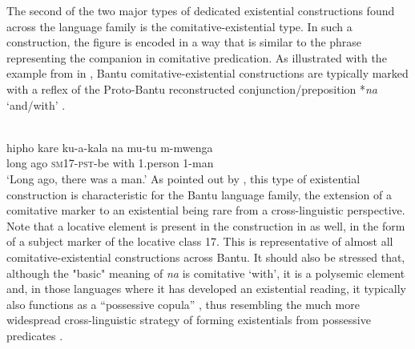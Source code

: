 \documentclass[output=paper,draft,draftmode,colorlinks,citecolor=brown]{langscibook}
\begin{document}
The second of the two major types of dedicated existential constructions found across the language family is the comitative-existential type. In such a construction, the figure is encoded in a way that is similar to the phrase representing the companion in comitative predication. As illustrated with the example from  in , Bantu comitative-existential constructions are typically marked with a reflex of the Proto-Bantu reconstructed conjunction/preposition *\textit{na} `and/with' \citep{BastinCoupez2002}.

\ea\label{ex:digo-man}
\\
\gll hipho kare ku-a-kala na mu-tu m-mwenga\\
  long ago \textsc{sm17-pst}-be with 1.person 1-man\\
\glt `Long ago, there was a man.'
\z
As pointed out by \citet{Creissels2014}, this type of existential
construction is characteristic for the Bantu language family, the extension
of a comitative marker to an existential being rare from a cross-linguistic
perspective. Note that a locative element is present in the construction in
 as well, in the form of a subject marker of the locative
class 17. This is representative of almost all comitative-existential constructions across Bantu. It should also be stressed that, although the "basic" meaning of \textit{na} is comitative `with', it is a polysemic element and, in those languages where it has developed an existential reading, it typically also functions as a ``possessive copula'' \citep{Marten2013,GibsonGuerois2018}, thus resembling the much more widespread cross-linguistic strategy of forming existentials from possessive predicates \citep{Creissels2013}.
\end{document}
